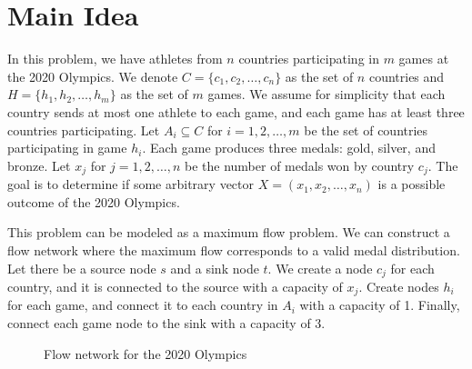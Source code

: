 \documentclass{article}
\begin{document}
\section{Main Idea}

In this problem, we have athletes from $n$ countries participating in $m$ games at the 2020 Olympics.
We denote $C = \{c_1, c_2, \ldots, c_n\}$ as the set of $n$ countries and $H = \{h_1, h_2, \ldots, h_m\}$ as the set of $m$ games.
We assume for simplicity that each country sends at most one athlete to each game, and each game has at least three countries participating.
Let $A_i \subseteq C$ for $i = 1, 2, \ldots, m$ be the set of countries participating in game $h_i$.
Each game produces three medals: gold, silver, and bronze.
Let $x_j$ for $j = 1, 2, \ldots, n$ be the number of medals won by country $c_j$.
The goal is to determine if some arbitrary vector $X = (x_1, x_2, \ldots, x_n)$ is a possible outcome of the 2020 Olympics.

This problem can be modeled as a maximum flow problem.
We can construct a flow network where the maximum flow corresponds to a valid medal distribution.
Let there be a source node $s$ and a sink node $t$.
We create a node $c_j$ for each country, and it is connected to the source with a capacity of $x_j$.
Create nodes $h_i$ for each game, and connect it to each country in $A_i$ with a capacity of 1.
Finally, connect each game node to the sink with a capacity of 3.

\begin{figure}[h]
    \centering
    \caption{Flow network for the 2020 Olympics}
\end{figure}
\end{document}
